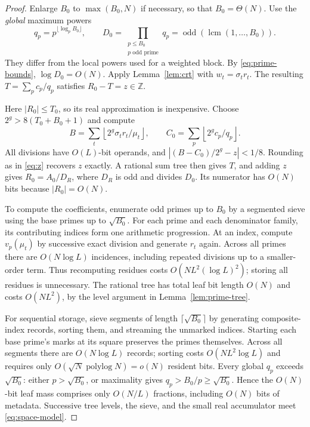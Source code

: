 \documentclass[11pt]{article}
\numberwithin{equation}{section}
\theoremstyle{definition}
\newcommand{\Z}{\mathbb Z}
\newcommand{\odd}{\operatorname{odd}}
\newcommand{\lcm}{\operatorname{lcm}}
\begin{document}
\begin{proof}
Enlarge $B_0$ to $\max(B_0,N)$ if necessary, so that
$B_0=\Theta(N)$. Use the \emph{global} maximum powers
\[
 q_p=p^{\lfloor\log_p B_0\rfloor},\qquad
 D_0=\prod_{\substack{p\le B_0\\p\text{ odd prime}}}q_p
     =\odd(\lcm(1,\ldots,B_0)).
\]
They differ from the local powers used for a weighted block.
By \eqref{eq:prime-bounds}, $\log D_0=O(N)$.
Apply Lemma~\ref{lem:crt} with $w_t=\sigma_t r_t$.
The resulting $T=\sum_p c_p/q_p$ satisfies $R_0-T=z\in\Z$.

Here $|R_0|\le T_0$, so its real approximation is inexpensive.
Choose $2^g>8(T_0+B_0+1)$ and compute
\[
 B=\sum_t\left\lfloor2^g\sigma_t r_t/\mu_t\right\rfloor,
 \qquad C_0=\sum_p\left\lfloor2^gc_p/q_p\right\rfloor.
\]
All divisions have $O(L)$-bit operands, and
$|(B-C_0)/2^g-z|<1/8$. Rounding as in \eqref{eq:z}
recovers $z$ exactly. A rational sum tree then gives $T$,
and adding $z$ gives $R_0=A_0/D_R$, where $D_R$ is odd
and divides $D_0$. Its numerator has $O(N)$ bits because
$|R_0|=O(N)$.

To compute the coefficients, enumerate odd primes up to $B_0$
by a segmented sieve using the base primes up to $\sqrt{B_0}$.
For each prime and each denominator family, its contributing
indices form one arithmetic progression. At an index, compute
$v_p(\mu_t)$ by successive exact division and generate $r_t$
again. Across all primes there are $O(N\log L)$ incidences,
including repeated divisions up to a smaller-order term.
Thus recomputing residues costs
$O(NL^2(\log L)^2)$; storing all residues is unnecessary.
The rational tree has total leaf bit length $O(N)$ and
costs $O(NL^2)$, by the level argument in
Lemma~\ref{lem:prime-tree}.

For sequential storage, sieve segments of length
$\lceil\sqrt{B_0}\rceil$ by generating composite-index records,
sorting them, and streaming the unmarked indices. Starting
each base prime's marks at its square preserves the primes
themselves. Across all segments there are $O(N\log L)$
records; sorting costs $O(NL^2\log L)$ and requires only
$O(\sqrt N\operatorname{polylog}N)=o(N)$ resident bits.
Every global $q_p$ exceeds $\sqrt{B_0}$: either
$p>\sqrt{B_0}$, or maximality gives
$q_p>B_0/p\ge\sqrt{B_0}$. Hence the $O(N)$-bit leaf
mass comprises only $O(N/L)$ fractions, including $O(N)$
bits of metadata. Successive tree levels, the sieve,
and the small real accumulator meet \eqref{eq:space-model}.
\end{proof}
\end{document}
